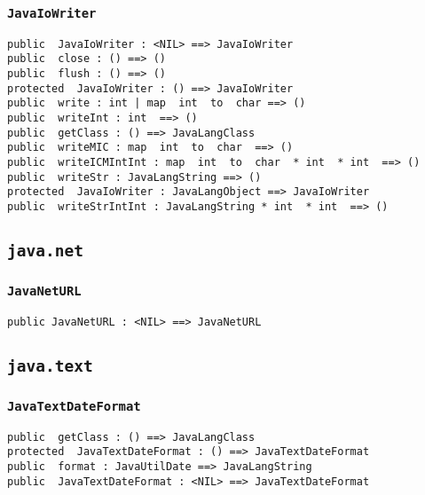 \documentclass[\pformat,12pt]{article}
\begin{document}
\subsubsection{\texttt{JavaIoWriter}}
\begin{small}
\begin{verbatim}
public  JavaIoWriter : <NIL> ==> JavaIoWriter
public  close : () ==> ()
public  flush : () ==> ()
protected  JavaIoWriter : () ==> JavaIoWriter
public  write : int | map  int  to  char ==> ()
public  writeInt : int  ==> ()
public  getClass : () ==> JavaLangClass
public  writeMIC : map  int  to  char  ==> ()
public  writeICMIntInt : map  int  to  char  * int  * int  ==> ()
public  writeStr : JavaLangString ==> ()
protected  JavaIoWriter : JavaLangObject ==> JavaIoWriter
public  writeStrIntInt : JavaLangString * int  * int  ==> ()
\end{verbatim}
\end{small}

\subsection{\texttt{java.net}}

\subsubsection{\texttt{JavaNetURL}}
\begin{small}
\begin{verbatim}
public JavaNetURL : <NIL> ==> JavaNetURL
\end{verbatim}
\end{small}

\subsection{\texttt{java.text}}

\subsubsection{\texttt{JavaTextDateFormat}}
\begin{small}
\begin{verbatim}
public  getClass : () ==> JavaLangClass
protected  JavaTextDateFormat : () ==> JavaTextDateFormat
public  format : JavaUtilDate ==> JavaLangString
public  JavaTextDateFormat : <NIL> ==> JavaTextDateFormat
\end{verbatim}
\end{small}
\end{document}
